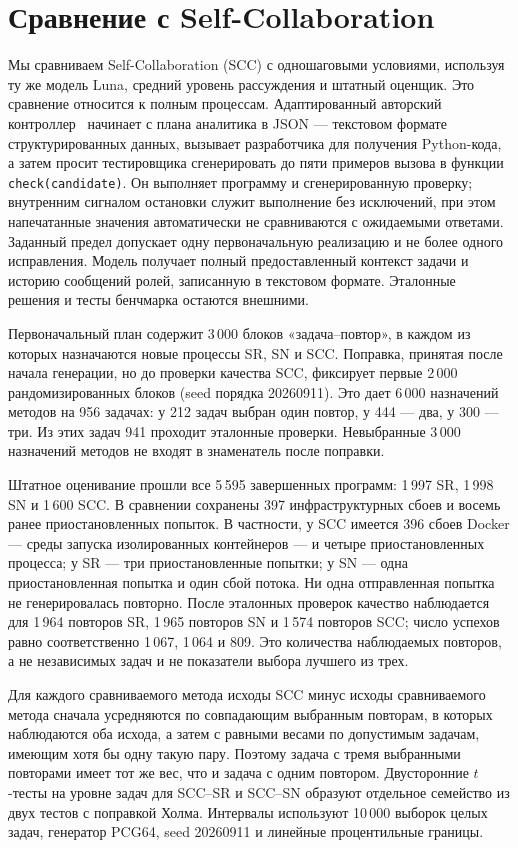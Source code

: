 \FloatBarrier
\section{Сравнение с Self-Collaboration}\label{sec:scc}
Мы сравниваем Self-Collaboration (SCC) с одношаговыми условиями, используя ту же модель Luna, средний уровень рассуждения и штатный оценщик. Это сравнение относится к полным процессам. Адаптированный авторский контроллер~\cite{scc2024source} начинает с плана аналитика в JSON --- текстовом формате структурированных данных, вызывает разработчика для получения Python-кода, а затем просит тестировщика сгенерировать до пяти примеров вызова в функции \texttt{check(candidate)}. Он выполняет программу и сгенерированную проверку; внутренним сигналом остановки служит выполнение без исключений, при этом напечатанные значения автоматически не сравниваются с ожидаемыми ответами. Заданный предел допускает одну первоначальную реализацию и не более одного исправления. Модель получает полный предоставленный контекст задачи и историю сообщений ролей, записанную в текстовом формате. Эталонные решения и тесты бенчмарка остаются внешними.

Первоначальный план содержит 3\,000 блоков «задача--повтор», в каждом из которых назначаются новые процессы SR, SN и SCC. Поправка, принятая после начала генерации, но до проверки качества SCC, фиксирует первые 2\,000 рандомизированных блоков (seed порядка 20260911). Это дает 6\,000 назначений методов на 956 задачах: у 212 задач выбран один повтор, у 444 --- два, у 300 --- три. Из этих задач 941 проходит эталонные проверки. Невыбранные 3\,000 назначений методов не входят в знаменатель после поправки.

Штатное оценивание прошли все 5\,595 завершенных программ: 1\,997 SR, 1\,998 SN и 1\,600 SCC. В сравнении сохранены 397 инфраструктурных сбоев и восемь ранее приостановленных попыток. В частности, у SCC имеется 396 сбоев Docker --- среды запуска изолированных контейнеров --- и четыре приостановленных процесса; у SR --- три приостановленные попытки; у SN --- одна приостановленная попытка и один сбой потока. Ни одна отправленная попытка не генерировалась повторно. После эталонных проверок качество наблюдается для 1\,964 повторов SR, 1\,965 повторов SN и 1\,574 повторов SCC; число успехов равно соответственно 1\,067, 1\,064 и 809. Это количества наблюдаемых повторов, а не независимых задач и не показатели выбора лучшего из трех.

Для каждого сравниваемого метода исходы SCC минус исходы сравниваемого метода сначала усредняются по совпадающим выбранным повторам, в которых наблюдаются оба исхода, а затем с равными весами по допустимым задачам, имеющим хотя бы одну такую пару. Поэтому задача с тремя выбранными повторами имеет тот же вес, что и задача с одним повтором. Двусторонние $t$-тесты на уровне задач для SCC--SR и SCC--SN образуют отдельное семейство из двух тестов с поправкой Холма. Интервалы используют 10\,000 выборок целых задач, генератор PCG64, seed 20260911 и линейные процентильные границы.

